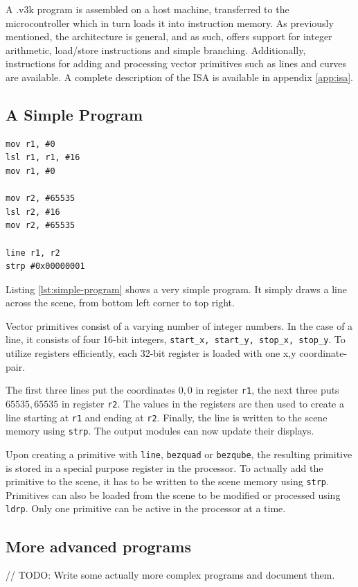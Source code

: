 A .v3k program is assembled on a host machine, transferred to the microcontroller which in turn loads it into instruction memory.
As previously mentioned, the \vthreek architecture is general, and as such, offers support for integer arithmetic, load/store instructions and simple branching.
Additionally, instructions for adding and processing vector primitives such as lines and curves are available.
A complete description of the \vthreek ISA is available in appendix \ref{app:isa}.

\subsection{A Simple \vthreek Program}

\begin{lstlisting}[label=lst:simple-program]
mov r1, #0
lsl r1, r1, #16
mov r1, #0

mov r2, #65535
lsl r2, #16
mov r2, #65535

line r1, r2
strp #0x00000001
\end{lstlisting}

Listing \ref{lst:simple-program} shows a very simple \vthreek program.
It simply draws a line across the scene, from bottom left corner to top right.

Vector primitives consist of a varying number of integer numbers.
In the case of a line, it consists of four 16-bit integers, \texttt{start\_x, start\_y, stop\_x, stop\_y}.
To utilize registers efficiently, each 32-bit register is loaded with one x,y coordinate-pair.

The first three lines put the coordinates $0,0$ in register \texttt{r1}, the next three puts $65535,65535$ in register \texttt{r2}.
The values in the registers are then used to create a line starting at \texttt{r1} and ending at \texttt{r2}.
Finally, the line is written to the scene memory using \texttt{strp}.
The output modules can now update their displays.

Upon creating a primitive with \texttt{line}, \texttt{bezquad} or \texttt{bezqube}, the resulting primitive is stored in a special purpose register in the processor.
To actually add the primitive to the scene, it has to be written to the scene memory using \texttt{strp}.
Primitives can also be loaded from the scene to be modified or processed using \texttt{ldrp}.
Only one primitive can be active in the processor at a time.

\subsection{More advanced programs}

// TODO: Write some actually more complex programs and document them.
